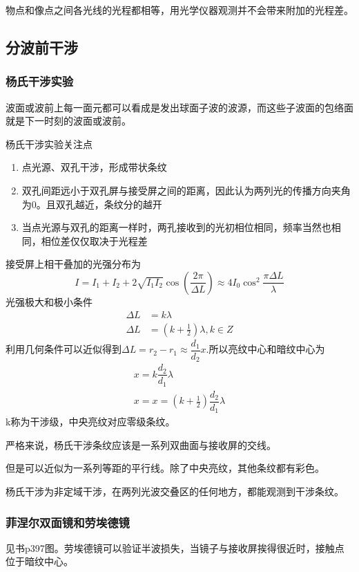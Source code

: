 物点和像点之间各光线的光程都相等，用光学仪器观测并不会带来附加的光程差。

\subsection{分波前干涉}
\subsubsection{杨氏干涉实验}
波面或波前上每一面元都可以看成是发出球面子波的波源，而这些子波面的包络面就是下一时刻的波面或波前。

杨氏干涉实验关注点
\begin{enumerate}
    \item 点光源、双孔干涉，形成带状条纹
    \item 双孔间距远小于双孔屏与接受屏之间的距离，因此认为两列光的传播方向夹角为0。且双孔越近，条纹分的越开
    \item 当点光源与双孔的距离一样时，两孔接收到的光初相位相同，频率当然也相同，相位差仅仅取决于光程差
\end{enumerate}
接受屏上相干叠加的光强分布为
\begin{equation}
    I=I_1+I_2+2\sqrt{I_1I_2}\cos (\dfrac{2\pi}{\Delta L})\approx 4I_0 \cos ^2 \dfrac{\pi \Delta L}{\lambda}
\end{equation}
光强极大和极小条件
\begin{align}
    \Delta L&=k\lambda\\
    \Delta L&=(k+\frac{1}{2})\lambda,k\in Z
\end{align}
利用几何条件可以近似得到$\Delta L=r_2-r_1\approx \dfrac{d_1}{d_2}x$.所以亮纹中心和暗纹中心为
\begin{align}
    x=k\dfrac{d_2}{d_1}\lambda\\
    x= x=(k+\frac{1}{2})\dfrac{d_2}{d_1}\lambda
\end{align}
k称为干涉级，中央亮纹对应零级条纹。

严格来说，杨氏干涉条纹应该是一系列双曲面与接收屏的交线。

但是可以近似为一系列等距的平行线。除了中央亮纹，其他条纹都有彩色。

杨氏干涉为非定域干涉，在两列光波交叠区的任何地方，都能观测到干涉条纹。
\subsubsection{菲涅尔双面镜和劳埃德镜}见书p397图。劳埃德镜可以验证半波损失，当镜子与接收屏挨得很近时，接触点位于暗纹中心。

